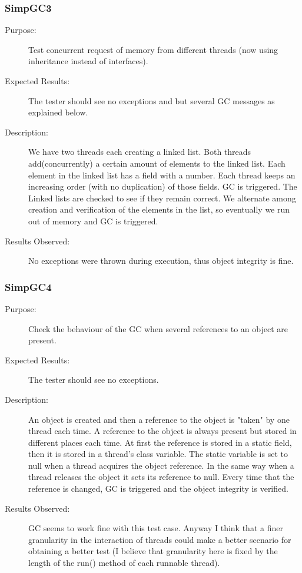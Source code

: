 \subsubsection{SimpGC3}

\begin{description}
    \item[Purpose:]
Test concurrent request of memory from different threads (now using
inheritance instead of interfaces).
    \item[Expected Results:]
The tester should see no exceptions and but several GC messages as
explained below.
    \item[Description:]
We have two threads each creating a linked list. Both threads
add(concurrently) a certain amount of elements to the linked list.
Each element in the linked list has a field with a number. Each
thread keeps an increasing order (with no duplication) of those
fields.  GC is triggered. The Linked lists are checked to see if
they remain correct. We alternate among creation and verification of
the elements in the list, so eventually we run out of memory and GC
is triggered.
    \item[Results Observed:]
No exceptions were thrown during execution, thus object integrity is
fine.
\end{description}

\subsubsection{SimpGC4}

\begin{description}
    \item[Purpose:]
Check the behaviour of the GC when several references to an object
are present.
    \item[Expected Results:]
The tester should see no exceptions.
    \item[Description:]
An object is created and then a reference to the object is "taken"
by one thread each time. A reference to the object is always present
but stored in different places each time. At first the reference is
stored in a static field, then it is stored in a thread's class
variable. The static variable is set to null when a thread acquires
the object reference. In the same way when a thread releases the
object it sets its reference to null. Every time that the reference
is changed, GC is triggered and the object integrity is verified.
    \item[Results Observed:]
GC seems to work fine with this test case. Anyway I think that a
finer granularity in the interaction of threads could make a better
scenario for obtaining a better test (I believe that granularity
here is fixed by the length of the run() method of each runnable
thread).
\end{description}

